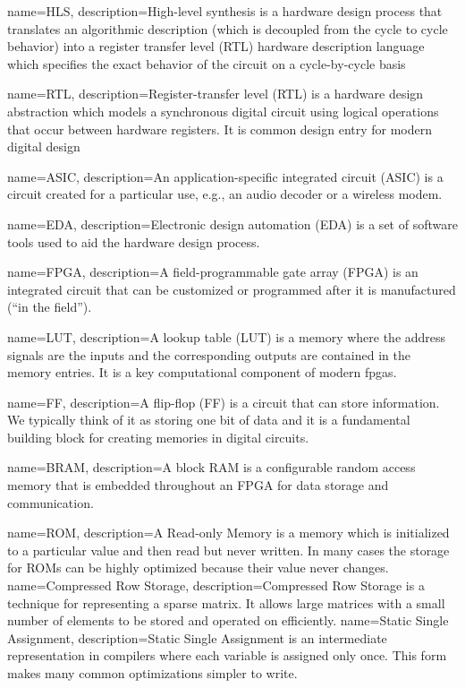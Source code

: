 
{
	name={HLS},
    	description={High-level synthesis is a hardware design process that translates an algorithmic description (which is decoupled from the cycle to cycle behavior) into a register transfer level (RTL) hardware description language which specifies the exact behavior of the circuit on a cycle-by-cycle basis}
}

{
	name={RTL},
    	description={Register-transfer level (RTL) is a hardware design abstraction which models a synchronous digital circuit using logical operations that occur between hardware registers. It is common design entry for modern digital design}
}

{
	name={ASIC},
    	description={An application-specific integrated circuit (ASIC) is a circuit created for a particular use, e.g., an audio decoder or a wireless modem. }
}

{
	name={EDA},
    	description={Electronic design automation (EDA) is a set of software tools used to aid the hardware design process.  }
}

{
	name={FPGA},
    	description={A field-programmable gate array (FPGA) is an integrated circuit that can be customized or programmed after it is manufactured (``in the field''). }
}

{
	name={LUT},
    	description={A lookup table (LUT) is a memory where the address signals are the inputs and the corresponding outputs are contained in the memory entries. It is a key computational component of modern \gls{fpga}s.}
}

{
	name={FF},
    	description={A flip-flop (FF) is a circuit that can store information. We typically think of it as storing one bit of data and it is a fundamental building block for creating memories in digital circuits.}
}

{
	name={BRAM},
    	description={A block RAM is a configurable random access memory that is embedded throughout an FPGA for data storage and communication.}
}

{
	name={ROM},
    	description={A Read-only Memory is a memory which is initialized to a particular value and then read but never written.  In many cases the storage for ROMs can be highly optimized because their value never changes.}
}
{
	name={Compressed Row Storage},
    	description={Compressed Row Storage is a technique for representing a sparse matrix.  It allows large matrices with a small number of elements to be stored and operated on efficiently.}
}
{
	name={Static Single Assignment},
    	description={Static Single Assignment is an intermediate representation in compilers where each variable is assigned only once.  This form makes many common optimizations simpler to write.}
}

